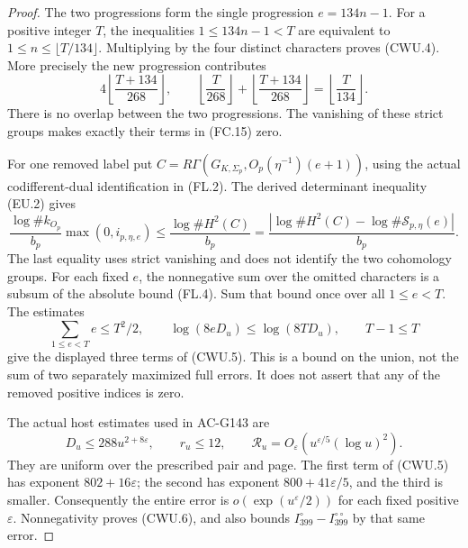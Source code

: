 \begin{proof}
The two progressions form the single progression $e=134n-1$.
For a positive integer $T$, the inequalities $1\leq134n-1<T$
are equivalent to $1\leq n\leq\lfloor T/134\rfloor$.
Multiplying by the four distinct characters proves (CWU.4).
More precisely the new progression contributes
\[
 4\left\lfloor\frac{T+134}{268}\right\rfloor,
 \qquad
 \left\lfloor\frac{T}{268}\right\rfloor+
 \left\lfloor\frac{T+134}{268}\right\rfloor
                 =\left\lfloor\frac{T}{134}\right\rfloor.
 \tag{CWU.8}
\]
There is no overlap between the two progressions.  The vanishing
of these strict groups makes exactly their terms in (FC.15) zero.

For one removed label put
$C=R\Gamma(G_{K,\Sigma_p},O_p(\eta^{-1})(e+1))$,
using the actual codifferent-dual identification in (FL.2).
The derived determinant inequality (EU.2) gives
\[
 \frac{\log\#k_{O_p}}{b_p}\max(0,i_{p,\eta,e})
 \leq\frac{\log\#H^2(C)}{b_p}
 =\frac{\left|\log\#H^2(C)
                  -\log\#\mathcal S_{p,\eta}(e)\right|}{b_p}.
 \tag{CWU.9}
\]
The last equality uses strict vanishing and does not identify the
two cohomology groups.  For each fixed $e$, the nonnegative sum
over the omitted characters is a subsum of the absolute bound
(FL.4).  Sum that bound once over all $1\leq e<T$.
The estimates
\[
 \sum_{1\leq e<T}e\leq T^2/2,\qquad
 \log(8eD_u)\leq\log(8TD_u),\qquad T-1\leq T
\]
give the displayed three terms of (CWU.5).  This is a bound on the
union, not the sum of two separately maximized full errors.
It does not assert that any of the removed positive indices is zero.

The actual host estimates used in AC-G143 are
\[
 D_u\leq288u^{2+8\varepsilon},\qquad r_u\leq12,
 \qquad\mathcal R_u=O_\varepsilon
                     (u^{\varepsilon/5}(\log u)^2).
 \tag{CWU.10}
\]
They are uniform over the prescribed pair and page.  The first
term of (CWU.5) has exponent $802+16\varepsilon$; the second has
exponent $800+41\varepsilon/5$, and the third is smaller.
Consequently the entire error is
$o(\exp(u^\varepsilon/2))$ for each fixed positive $\varepsilon$.
Nonnegativity proves (CWU.6), and also bounds
$I_{399}^{\circ}-I_{399}^{\circ\circ}$ by that same error.


\end{proof}
